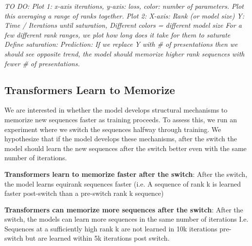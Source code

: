 \documentclass{article}
\theoremstyle{plain}
\theoremstyle{definition}
\theoremstyle{remark}
\begin{document}
\textit{TO DO:
Plot 1: x-axis iterations, y-axis: loss, color: number of parameters. Plot this averaging a range of ranks together.
Plot 2: X-axis: Rank (or model size)
Y: Time / Iterations until saturation, Different colors = different model size
For a few different rank ranges, we plot how long does it take for them to saturate 
Define saturation: 
Prediction: If we replace Y with \# of presentations then we should see opposite trend, the model should memorize higher rank sequences with fewer \# of presentations.}  

\subsection{Transformers Learn to Memorize}
We are interested in whether the model develops structural mechanisms to memorize new sequences faster as training proceeds. To assess this, we run an experiment where we switch the sequences halfway through training. We hypothesize that if the model develops these mechanisms, after the switch the model should learn the new sequences after the switch better even with the same number of iterations. 

\textbf{Transformers learn to memorize faster after the switch}: After the switch, the model learns equirank sequences faster (i.e. A sequence of rank k is learned faster post-switch than a pre-switch rank k sequence)

\textbf{Transformers can memorize more sequences after the switch}: After the switch, the models can learn more sequences in the same number of iterations
I.e. Sequences at a sufficiently high rank k are not learned in 10k iterations pre-switch but are learned within 5k iterations post switch.
\end{document}
